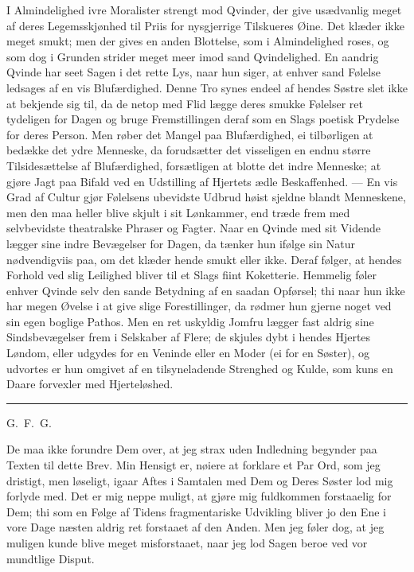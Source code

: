 \documentclass[12pt]{article}
\newcommand{\opage}[1]{\marginnote{\footnotesize\textit{[#1]}}}
\newcommand{\qvbreak}{\par\medskip\begin{center}\rule{0.32\textwidth}{0.4pt}\end{center}\medskip}
\begin{document}
I Almindelighed ivre Moralister strengt mod Qvinder, der give usædvanlig meget af
deres Legemsskjønhed til Priis for nysgjerrige Tilskueres Øine. Det klæder ikke
meget smukt; men der gives en anden Blottelse, som i Almindelighed roses, og som
dog i Grunden strider meget meer imod sand Qvindelighed. \opage{9}En aandrig
Qvinde har seet Sagen i det rette Lys, naar hun siger, at enhver sand Følelse
ledsages af en vis Blufærdighed. Denne Tro synes endeel af hendes Søstre slet
ikke at bekjende sig til, da de netop med Flid lægge deres smukke Følelser ret
tydeligen for Dagen og bruge Fremstillingen deraf som en Slags poetisk Prydelse
for deres Person. Men røber det Mangel paa Blufærdighed, ei tilbørligen at
bedække det ydre Menneske, da forudsætter det visseligen en endnu større
Tilsidesættelse af Blufærdighed, forsætligen at blotte det indre Menneske; at
gjøre Jagt paa Bifald ved en Udstilling af Hjertets ædle Beskaffenhed. --- En vis
Grad af Cultur gjør Følelsens ubevidste Udbrud høist sjeldne blandt Menneskene,
men den maa heller blive skjult i sit Lønkammer, end træde frem med selvbevidste
theatralske Phraser og Fagter. Naar en Qvinde med sit Vidende lægger sine indre
Bevægelser for Dagen, da tænker hun ifølge sin Natur nødvendigviis paa, om det
klæder hende smukt eller ikke. Deraf følger, at hendes Forhold ved slig Leilighed
bliver til et Slags fiint Koketterie. Hemmelig føler enhver Qvinde selv den sande
Betydning af en saadan Opførsel; thi naar hun ikke har megen Øvelse i at give
slige Forestillinger, da rødmer hun gjerne noget ved sin egen boglige Pathos. Men
en ret uskyldig Jomfru lægger fast aldrig sine Sindsbevægelser frem i Selskaber
af Flere; de skjules dybt i hendes Hjertes Løndom, eller udgydes for en Veninde
eller en Moder (ei for en Søster), og udvortes er hun omgivet af en tilsyneladende
Strenghed og Kulde, som kuns en Daare forvexler med Hjerteløshed.

\qvbreak

\begin{center}\large G.~F.~G.\end{center}

De maa ikke forundre Dem over, at jeg strax uden Indledning begynder paa Texten
til dette Brev. Min Hensigt er, \opage{10}nøiere at forklare et Par Ord, som jeg
dristigt, men løseligt, igaar Aftes i Samtalen med Dem og Deres Søster lod mig
forlyde med. Det er mig neppe muligt, at gjøre mig fuldkommen forstaaelig for
Dem; thi som en Følge af Tidens fragmentariske Udvikling bliver jo den Ene i vore
Dage næsten aldrig ret forstaaet af den Anden. Men jeg føler dog, at jeg muligen
kunde blive meget misforstaaet, naar jeg lod Sagen beroe ved vor mundtlige
Disput.
\end{document}
